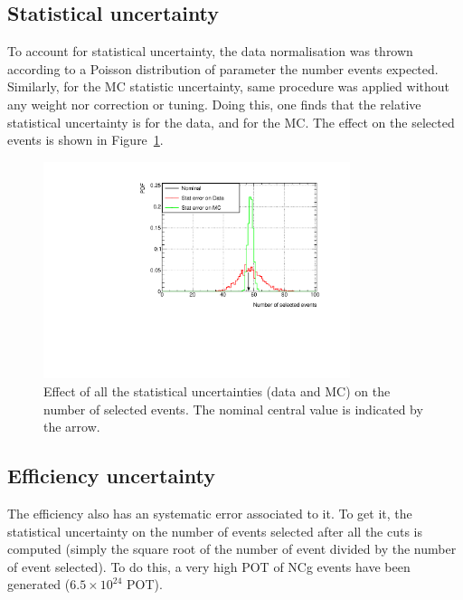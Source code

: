

\subsection{Statistical uncertainty}
\label{subsec:statuncertainty}
To account for statistical uncertainty, the data normalisation was
thrown according to a Poisson distribution of parameter the number
events expected. Similarly, for the \Gls{MC} statistic uncertainty,
same procedure was applied without any weight nor correction or
tuning. Doing this, one finds that the relative statistical
uncertainty is \datastaterror for the data, and \mcstaterror for the
\Gls{MC}. The effect on the selected events is shown in
Figure~\ref{fig:statuncertainty}.

\begin{figure}[ht]
  \begin{adjustbox}{center}
    \includegraphics[width=0.8\textwidth]{images/NCg/stat.pdf}
  \end{adjustbox}
  \caption[Effect of all the statistical uncertainties on the number
  of selected events]{Effect of all the statistical uncertainties
    (data and \Gls{MC}) on the number of selected events. The nominal
    central value is indicated by the arrow.}
  \label{fig:statuncertainty}
\end{figure}

\subsection{Efficiency uncertainty}
\label{subsec:effuncertainty}
The efficiency also has an systematic error associated to it. To get
it, the statistical uncertainty on the number of events selected after
all the cuts is computed (simply the square root of the number of
event divided by the number of event selected).  To do this, a very
high \Gls{POT} of \Gls{NCg} events have been generated
($6.5\times 10^{24}$ \Gls{POT}).

